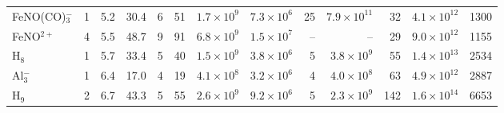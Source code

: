 \begin{table}[!htbp]
\begin{tabular}{lrrrrrrrrrrrr}
FeNO(CO)$_3^-$ & 1 & 5.2 & 30.4 & 6 & 51 & $1.7\times10^{9}$ & $7.3\times10^{6}$ & 25 & $7.9\times10^{11}$ & 32 & $4.1\times10^{12}$ & 1300 \\
FeNO$^{2+}$ & 4 & 5.5 & 48.7 & 9 & 91 & $6.8\times10^{9}$ & $1.5\times10^{7}$ & -- & -- & 29 & $9.0\times10^{12}$ & 1155 \\
H$_8$ & 1 & 5.7 & 33.4 & 5 & 40 & $1.5\times10^{9}$ & $3.8\times10^{6}$ & 5 & $3.8\times10^{9}$ & 55 & $1.4\times10^{13}$ & 2534 \\
Al$_3^-$ & 1 & 6.4 & 17.0 & 4 & 19 & $4.1\times10^{8}$ & $3.2\times10^{6}$ & 4 & $4.0\times10^{8}$ & 63 & $4.9\times10^{12}$ & 2887 \\
H$_9$ & 2 & 6.7 & 43.3 & 5 & 55 & $2.6\times10^{9}$ & $9.2\times10^{6}$ & 5 & $2.3\times10^{9}$ & 142 & $1.6\times10^{14}$ & 6653 \\
\bottomrule
\end{tabular}
\end{table}
